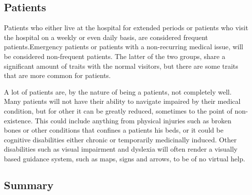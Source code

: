
\subsection{Patients} %

Patients who either live at the hospital for extended periods or patients who visit the hospital on a weekly or even daily basis, are considered frequent patients.Emergency patients or patients with a non-recurring medical issue, will be considered non-frequent patients. The latter of the two groups, share a significant amount of traits with the normal visitors, but there are some traits that are more common for patients.

A lot of patients are, by the nature of being a patients, not completely well. Many patients will not have their ability to navigate impaired by their medical condition, but for other it can be greatly reduced, sometimes to the point of non-existence. This could include anything from physical injuries such as broken bones or other conditions that confines a patients his beds, or it could be cognitive disabilities either chronic or temporarily medicinally induced. Other disabilities such as visual impairment and dyslexia will often render a visually based guidance system, such as maps, signs and arrows, to be of no virtual help.


\subsection{Summary}



